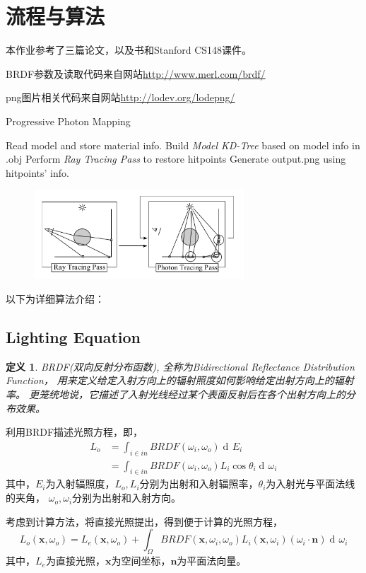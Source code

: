 \documentclass[a4paper,12pt]{article}
\theoremstyle{plain}
\newtheorem{thmdef}{\hspace{\parindent}定义}
\numberwithin{thmdef}{section}
\begin{document}
\section{流程与算法}
本作业参考了三篇论文\cite{ppm}\cite{ppr}\cite{lirui}，以及书\cite{pm}和Stanford CS148课件。\par
BRDF参数及读取代码来自网站\url{http://www.merl.com/brdf/}\par
png图片相关代码来自网站\url{http://lodev.org/lodepng/}
\\
\begin{algorithm}[H]
\caption{Progressive Photon Mapping}
\LinesNumbered
{}
Read model and store material info.\;
Build \textit{Model KD-Tree} based on model info in .obj\;
Perform \textit{Ray Tracing Pass} to restore hitpoints\;
Generate output.png using hitpoints' info.\;
\end{algorithm}\par

\begin{figure}[!h]
\centering
\includegraphics[width=0.7\textwidth]{overall}
\end{figure}
以下为详细算法介绍：
\subsection{Lighting Equation}
\begin{thmdef}
BRDF(双向反射分布函数), 全称为Bidirectional Reflectance Distribution Function，%
用来定义给定入射方向上的辐射照度如何影响给定出射方向上的辐射率。%
更笼统地说，它描述了入射光线经过某个表面反射后在各个出射方向上的分布效果。
\end{thmdef}\par
利用BRDF描述光照方程，即，
\begin{align}
L_o&=\int_{i\in in}BRDF(\omega_i,\omega_o)\mathop{d\!}E_i\\
&=\int_{i\in in}BRDF(\omega_i,\omega_o)L_i\cos\theta_i\mathop{d\!}\omega_i
\end{align}
其中，$E_i$为入射辐照度，$L_o,L_i$分别为出射和入射辐照率，$\theta_i$为入射光与平面法线的夹角，%
$\omega_o,\omega_i$分别为出射和入射方向。\par
考虑到计算方法，将直接光照提出，得到便于计算的光照方程，
\begin{equation}
L_o(\mathbf{x},\omega_o)=L_e(\mathbf{x},\omega_o)+\int_\Omega BRDF(\mathbf{x},\omega_i,%
\omega_o)L_i(\mathbf{x},\omega_i)(\omega_i\cdot\mathbf{n})\mathop{d\!}\omega_i
\end{equation}
其中，$L_e$为直接光照，$\mathbf{x}$为空间坐标，$\mathbf{n}$为平面法向量。
\end{document}
